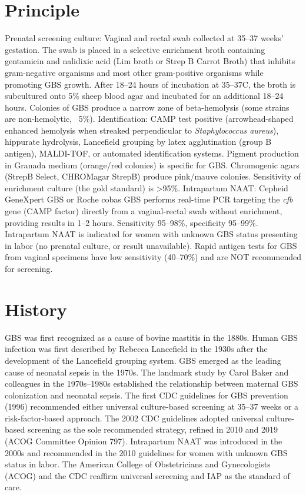 \section*{Principle}
Prenatal screening culture: Vaginal and rectal swab collected at 35--37 weeks' gestation. The swab is placed in a selective enrichment broth containing gentamicin and nalidixic acid (Lim broth or Strep B Carrot Broth) that inhibits gram-negative organisms and most other gram-positive organisms while promoting GBS growth. After 18--24 hours of incubation at 35--37\textdegree{}C, the broth is subcultured onto 5\% sheep blood agar and incubated for an additional 18--24 hours. Colonies of GBS produce a narrow zone of beta-hemolysis (some strains are non-hemolytic, ~5\%). Identification: CAMP test positive (arrowhead-shaped enhanced hemolysis when streaked perpendicular to \textit{Staphylococcus aureus}), hippurate hydrolysis, Lancefield grouping by latex agglutination (group B antigen), MALDI-TOF, or automated identification systems. Pigment production in Granada medium (orange/red colonies) is specific for GBS. Chromogenic agars (StrepB Select, CHROMagar StrepB) produce pink/mauve colonies. Sensitivity of enrichment culture (the gold standard) is >95\%. Intrapartum NAAT: Cepheid GeneXpert GBS or Roche cobas GBS performs real-time PCR targeting the \textit{cfb} gene (CAMP factor) directly from a vaginal-rectal swab without enrichment, providing results in 1--2 hours. Sensitivity 95--98\%, specificity 95--99\%. Intrapartum NAAT is indicated for women with unknown GBS status presenting in labor (no prenatal culture, or result unavailable). Rapid antigen tests for GBS from vaginal specimens have low sensitivity (40--70\%) and are NOT recommended for screening.

\section*{History}
GBS was first recognized as a cause of bovine mastitis in the 1880s. Human GBS infection was first described by Rebecca Lancefield in the 1930s after the development of the Lancefield grouping system. GBS emerged as the leading cause of neonatal sepsis in the 1970s. The landmark study by Carol Baker and colleagues in the 1970s--1980s established the relationship between maternal GBS colonization and neonatal sepsis. The first CDC guidelines for GBS prevention (1996) recommended either universal culture-based screening at 35--37 weeks or a risk-factor-based approach. The 2002 CDC guidelines adopted universal culture-based screening as the sole recommended strategy, refined in 2010 and 2019 (ACOG Committee Opinion 797). Intrapartum NAAT was introduced in the 2000s and recommended in the 2010 guidelines for women with unknown GBS status in labor. The American College of Obstetricians and Gynecologists (ACOG) and the CDC reaffirm universal screening and IAP as the standard of care.

